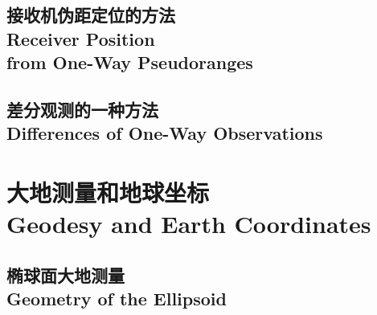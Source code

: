 \documentclass[a4paper,12pt]{book}
\begin{document}
	\chapter[接收机伪距定位的方法]{接收机伪距定位的方法\\Receiver Position \\from One-Way Pseudoranges}
	\minitoc %
	\newpage%
		
		
		
		
		
		
		
		
		
		
	
	\chapter[差分观测的一种方法]{差分观测的一种方法\\Differences of One-Way Observations}
	\minitoc %
	\newpage%
		
		
		
		
		
		
		
		
		
	

\part[大地测量和地球坐标]{大地测量和地球坐标\\Geodesy and Earth Coordinates}
	\chapter[椭球面大地测量]{椭球面大地测量\\Geometry of the Ellipsoid}
	\minitoc %
	\newpage%
		
		
		
		
		
		
		
		
		
		
\end{document}
